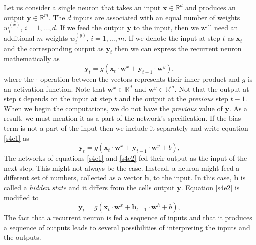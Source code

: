\documentclass[11pt]{article}
\numberwithin{equation}{section}
\renewcommand{\vec}{\mathbf}
\begin{document}
Let us consider a single neuron that takes an input $\vec{x} \in \mathbb{R}^d$
and produces an output $\vec{y} \in \mathbb{R}^m$. The $d$ inputs are
associated with an equal number of weights $w^{(x)}_i$, $i = 1, \ldots, d$. If
we feed the output $\vec{y}$ to the input, then we will need an additional
$m$ weights $w^{(y)}_i$, $i = 1, \ldots, m$. If we denote the input at step 
$t$ as $\vec{x}_t$ and the corresponding output as $\vec{y}_t$ then we can
express the recurrent neuron mathematically as
\begin{equation}\label{s4e1}
\vec{y}_t = g\left(\vec{x}_t\cdot\vec{w}^x+\vec{y}_{t-1}\cdot\vec{w}^y\right),
\end{equation}
where the $\cdot$ operation between the vectors represents their inner product
and $g$ is an activation function. Note that $\vec{w}^x \in \mathbb{R}^d$ and
$\vec{w}^y \in \mathbb{R}^m$. 
Not that the output at step $t$ depends on the input at step $t$ and the output
at the \emph{previous} step $t-1$. When we begin the computations, we do not
have the \emph{previous} value of $\vec{y}$. As a result, we must mention
it as a part of the network's specification. If the bias term is not a part
of the input then we include it separately and write equation \eqref{s4e1}
as
\begin{equation}\label{s4e2}
\vec{y}_t=g\left(\vec{x}_t\cdot\vec{w}^x+\vec{y}_{t-1}\cdot\vec{w}^y+b\right),
\end{equation}
The networks of equations \eqref{s4e1} and \eqref{s4e2} fed their output
as the input of the next step. This might not always be the case. Instead, a
neuron might feed a different set of numbers, collected as a vector $\vec{h}$,
to the input. In this case, $\vec{h}$ is called a \emph{hidden state} and it
differs from the cells output $\vec{y}$. Equation \eqref{s4e2} is modified
to
\begin{equation}\label{s4e3}
\vec{y}_t=g\left(\vec{x}_t\cdot\vec{w}^x+\vec{h}_{t-1}\cdot\vec{w}^h+b\right),
\end{equation}
The fact that a recurrent neuron is fed a sequence of inputs and that it 
produces a sequence of outputs leads to several possibilities of interpreting
the inputs and the outputs.
\end{document}
